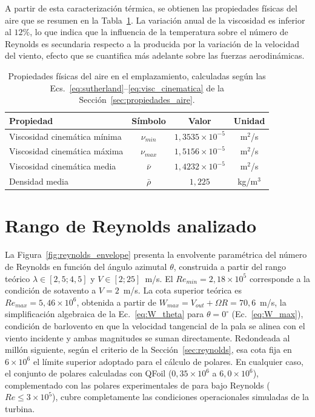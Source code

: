A partir de esta caracterización térmica, se obtienen las propiedades físicas del aire que se resumen en la Tabla~\ref{tab:propiedades_aire}. La variación anual de la viscosidad es inferior al $12\%$, lo que indica que la influencia de la temperatura sobre el número de Reynolds es secundaria respecto a la producida por la variación de la velocidad del viento, efecto que se cuantifica más adelante sobre las fuerzas aerodinámicas.

\begin{table}[H]
    \centering
    \caption{Propiedades físicas del aire en el emplazamiento, calculadas según las Ecs.~\ref{eq:sutherland}--\ref{eq:visc_cinematica} de la Sección~\ref{sec:propiedades_aire}.}
    \label{tab:propiedades_aire}
    \begin{tabular}{lccc}
        \hline
        \textbf{Propiedad} & \textbf{Símbolo} & \textbf{Valor} & \textbf{Unidad} \\
        \hline
        Viscosidad cinemática mínima & $\nu_{min}$ & $1{,}3535 \times 10^{-5}$ & m$^2$/s \\
        Viscosidad cinemática máxima & $\nu_{max}$ & $1{,}5156 \times 10^{-5}$ & m$^2$/s \\
        Viscosidad cinemática media   & $\bar{\nu}$ & $1{,}4232 \times 10^{-5}$ & m$^2$/s \\
        Densidad media & $\bar{\rho}$ & $1{,}225$ & kg/m$^3$ \\
        \hline
    \end{tabular}
\end{table}

\section{Rango de Reynolds analizado}

La Figura~\ref{fig:reynolds_envelope} presenta la envolvente paramétrica del número de Reynolds en función del ángulo azimutal $\theta$, construida a partir del rango teórico $\lambda \in [2{,}5; 4{,}5]$ y $V \in [2; 25]$~m/s. El $Re_{min} = 2{,}18 \times 10^5$ corresponde a la condición de sotavento a $V = 2$~m/s. La cota superior teórica es $Re_{max} = 5{,}46 \times 10^6$, obtenida a partir de $W_{max} = V_{out} + \Omega R = 70{,}6$~m/s, la simplificación algebraica de la Ec.~\ref{eq:W_theta} para $\theta = 0^\circ$ (Ec.~\ref{eq:W_max}), condición de barlovento en que la velocidad tangencial de la pala se alinea con el viento incidente y ambas magnitudes se suman directamente. Redondeada al millón siguiente, según el criterio de la Sección~\ref{sec:reynolds}, esa cota fija en $6 \times 10^6$ el límite superior adoptado para el cálculo de polares. En cualquier caso, el conjunto de polares calculadas con QFoil ($0{,}35 \times 10^6$ a $6{,}0 \times 10^6$), complementado con las polares experimentales de \textcite{Bianchini2015} para bajo Reynolds ($Re \leq 3 \times 10^5$), cubre completamente las condiciones operacionales simuladas de la turbina.

